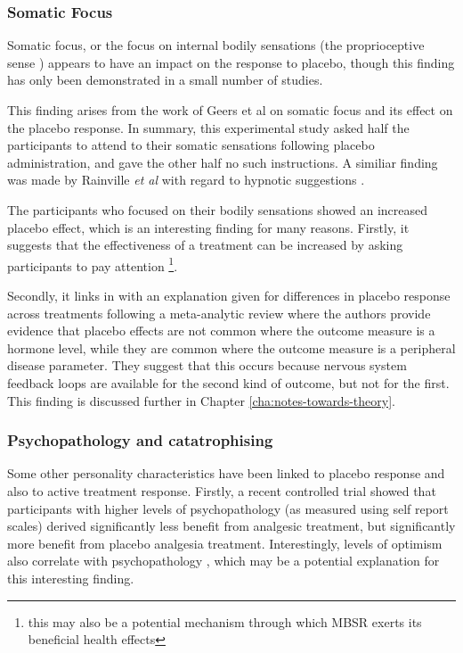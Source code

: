 \subsubsection{Somatic Focus}

Somatic focus, or the focus on internal bodily sensations (the proprioceptive sense ) appears to have an impact on the response to placebo, though this finding has only been demonstrated in a small number of studies. 

This finding arises from the work of Geers et al \cite{Geers2006}  on somatic focus and its effect on the placebo response. In summary, this experimental study asked half the participants to attend to their somatic sensations following placebo administration, and gave the other half no such instructions. A similiar finding was made by Rainville \textit{et al} with regard to hypnotic suggestions \cite{Price2008}. 

The participants who focused on their bodily sensations showed an increased placebo effect, which is an interesting finding for many reasons. Firstly, it suggests that the effectiveness of a treatment can be increased by asking participants to pay attention \footnote{this may also be a potential mechanism through which MBSR exerts its beneficial health effects}. 

Secondly, it links in with an explanation given for differences in placebo response across treatments following a meta-analytic review \cite{Meissner2007} where the authors provide evidence that placebo effects are not common where the outcome measure is a hormone level, while they are common where the outcome measure is a peripheral disease parameter. They suggest that this occurs because nervous system feedback loops are available for the second kind of outcome, but not for the first. This finding is discussed further in Chapter \ref{cha:notes-towards-theory}.  

\subsubsection{Psychopathology and catatrophising}
\label{sec:psych-catatr}



Some other personality characteristics have been linked to placebo response and also to active treatment response. Firstly, a recent controlled trial \cite{Wasan2005}  showed that participants with higher levels of psychopathology (as measured using self report scales) derived significantly less benefit from analgesic treatment, but significantly more benefit from placebo analgesia treatment. Interestingly, levels of optimism also correlate with psychopathology \cite{Carver2010}, which may be a potential explanation for this interesting finding.  

